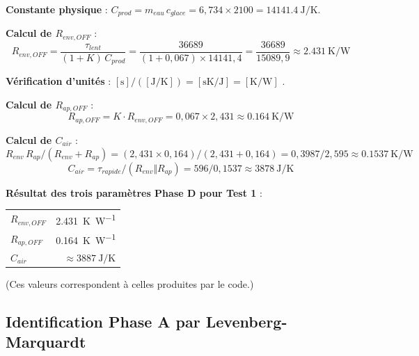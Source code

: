 \documentclass[11pt,a4paper]{article}
\begin{document}
\begin{exemple}
\textbf{Constante physique} : $C_{prod} = m_{eau}\,c_{glace} = 6{,}734 \times 2100
= \SI{14141,4}{\joule\per\kelvin}$.

\medskip
\textbf{Calcul de $R_{env,OFF}$} :
$$R_{env,OFF} = \frac{\tau_{lent}}{(1+K)\,C_{prod}}
= \frac{36689}{(1+0{,}067) \times 14141,4}
= \frac{36689}{15089,9}
\approx \SI{2,431}{\kelvin\per\watt}$$

\textbf{Vérification d'unités} :
$[\si{\second}]/([\si{\joule\per\kelvin}]) = [\si{\second\kelvin\per\joule}]
= [\si{\kelvin\per\watt}]$ \checkmark.

\medskip
\textbf{Calcul de $R_{ap,OFF}$} :
$$R_{ap,OFF} = K \cdot R_{env,OFF} = 0{,}067 \times 2{,}431 \approx \SI{0,164}{\kelvin\per\watt}$$

\medskip
\textbf{Calcul de $C_{air}$} :
$$R_{env}\,R_{ap}/(R_{env}+R_{ap}) = (2{,}431 \times 0{,}164)/(2{,}431 + 0{,}164)
= 0{,}3987/2{,}595 \approx \SI{0,1537}{\kelvin\per\watt}$$
$$C_{air} = \tau_{rapide}/(R_{env}\Vert R_{ap}) = 596/0{,}1537 \approx \SI{3878}{\joule\per\kelvin}$$

\textbf{Résultat des trois paramètres Phase D pour Test 1} :
\begin{center}
\begin{tabular}{lr}
$R_{env,OFF}$ & \SI{2,431}{\kelvin\per\watt}\\
$R_{ap,OFF}$ & \SI{0,164}{\kelvin\per\watt}\\
$C_{air}$ & $\approx \SI{3887}{\joule\per\kelvin}$\\
\end{tabular}
\end{center}
(Ces valeurs correspondent à celles produites par le code.)
\end{exemple}

\subsection{Identification Phase A par Levenberg-Marquardt}
\end{document}
